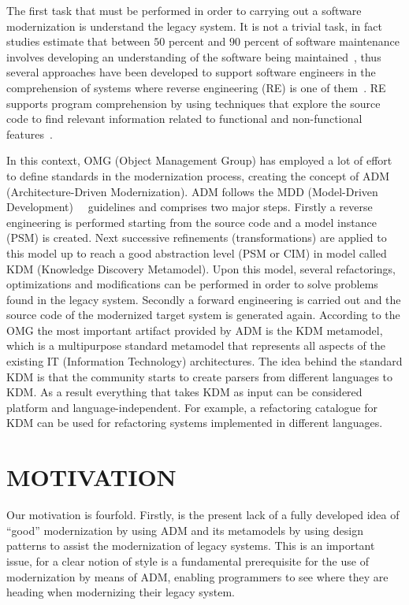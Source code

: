 \documentclass[a4paper,twoside]{article}
\begin{document}
The first task that must be performed in order to carrying out a software modernization is understand the legacy system. It is not a trivial task, in fact studies estimate that between $50$ percent and $90$ percent of software maintenance involves developing an understanding of the software being maintained~\cite{Tilley95perspectiveson}, thus several approaches have been developed to support software engineers in the comprehension of systems where reverse engineering (RE) is one of them~\cite{Canfora2011}. RE supports program comprehension by using techniques that explore the source code to find relevant information related to functional and non-functional features~\cite{chikofskyTax}.

In this context, OMG (Object Management Group) has employed a lot of effort to define standards in the modernization process, creating the concept of ADM (Architecture-Driven Modernization). ADM follows the MDD (Model-Driven Development)~\cite{Ulrich:2010:IST:1841736}~\cite{5440163} guidelines and comprises two major steps. Firstly a reverse engineering is performed starting from the source code and a model instance (PSM) is created. Next successive refinements (transformations) are applied to this model up to reach a good abstraction level (PSM or CIM) in model called KDM (Knowledge Discovery Metamodel). Upon this model, several refactorings, optimizations and modifications can be performed in order to solve problems found in the legacy system. Secondly a forward engineering is carried out and the source code of the modernized target system is generated again. According to the OMG the most important artifact provided by ADM is the KDM metamodel, which is a multipurpose standard metamodel that represents all aspects of the existing IT (Information  Technology) architectures. The idea behind the standard KDM is that the community starts to create parsers from different languages to KDM. As a result everything that takes KDM as input can be considered platform and language-independent. For example, a refactoring catalogue for KDM can be used for refactoring systems implemented in different languages. 

\section{\uppercase{Motivation}}

\noindent Our motivation is fourfold. Firstly, is the present lack of a fully developed idea of ``good'' modernization by using ADM and its metamodels by using design patterns to assist the modernization of legacy systems. This is an important issue, for a clear notion of style is a fundamental prerequisite for the use of modernization by means of ADM, enabling programmers to see where they are heading when modernizing their legacy system. 
\end{document}
